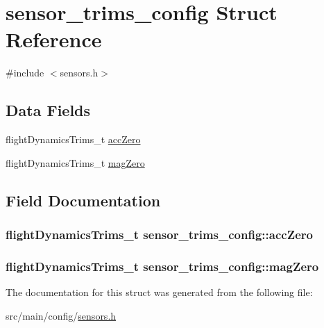 \hypertarget{structsensor__trims__config}{\section{sensor\+\_\+trims\+\_\+config Struct Reference}
\label{structsensor__trims__config}
}


{\ttfamily \#include $<$sensors.\+h$>$}

\subsection*{Data Fields}
\begin{DoxyCompactItemize}
\item 
flight\+Dynamics\+Trims\+\_\+t \hyperlink{structsensor__trims__config_afea81a170f345561cacff037cbc31c58}{acc\+Zero}
\item 
flight\+Dynamics\+Trims\+\_\+t \hyperlink{structsensor__trims__config_ac92c0be63c415344d6e239b85404a3b8}{mag\+Zero}
\end{DoxyCompactItemize}


\subsection{Field Documentation}
\hypertarget{structsensor__trims__config_afea81a170f345561cacff037cbc31c58}{
\subsubsection[{acc\+Zero}]{\setlength{\rightskip}{0pt plus 5cm}flight\+Dynamics\+Trims\+\_\+t sensor\+\_\+trims\+\_\+config\+::acc\+Zero}}\label{structsensor__trims__config_afea81a170f345561cacff037cbc31c58}
\hypertarget{structsensor__trims__config_ac92c0be63c415344d6e239b85404a3b8}{
\subsubsection[{mag\+Zero}]{\setlength{\rightskip}{0pt plus 5cm}flight\+Dynamics\+Trims\+\_\+t sensor\+\_\+trims\+\_\+config\+::mag\+Zero}}\label{structsensor__trims__config_ac92c0be63c415344d6e239b85404a3b8}


The documentation for this struct was generated from the following file\+:\begin{DoxyCompactItemize}
\item 
src/main/config/\hyperlink{sensors_8h}{sensors.\+h}\end{DoxyCompactItemize}
